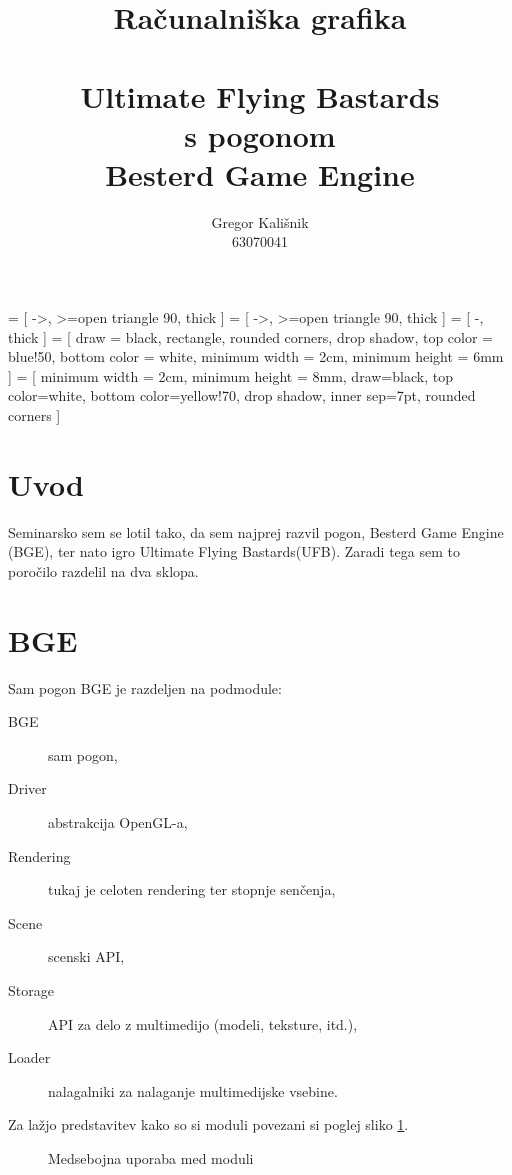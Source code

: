 \documentclass[a4paper]{article}
\author{Gregor Kališnik\\63070041}
\title{Računalniška grafika\\\ \\Ultimate Flying Bastards\\s pogonom\\Besterd Game Engine}
\begin{document}
 = [
  ->,
  >=open triangle 90,
  thick
]
 = [
  ->,
  >=open triangle 90,
  thick
]
 = [
  -,
  thick
]
 = [
  draw = black,
  rectangle,
  rounded corners,
  drop shadow,
  top color = blue!50,
  bottom color = white,
  minimum width = 2cm,
  minimum height = 6mm
]
 = [
  minimum width = 2cm,
  minimum height = 8mm,
  draw=black,
  top color=white,
  bottom color=yellow!70,
  drop shadow,
  inner sep=7pt,
  rounded corners
]

\maketitle
\pagebreak
\tableofcontents
\pagebreak
\listoffigures
\pagebreak

\section{Uvod}
Seminarsko sem se lotil tako, da sem najprej razvil pogon, Besterd Game Engine (BGE), ter nato igro Ultimate Flying Bastards(UFB). Zaradi tega sem to poročilo razdelil na dva sklopa.

\section{BGE}
Sam pogon BGE je razdeljen na podmodule:
\begin{description}
  \item[BGE] sam pogon,
  \item[Driver] abstrakcija OpenGL-a,
  \item[Rendering] tukaj je celoten rendering ter stopnje senčenja,
  \item[Scene] scenski API,
  \item[Storage] API za delo z multimedijo (modeli, teksture, itd.),
  \item[Loader] nalagalniki za nalaganje multimedijske vsebine.
\end{description}

Za lažjo predstavitev kako so si moduli povezani si poglej sliko \ref{graf:moduli}.
\begin{figure}
\centering
{}

\label{graf:moduli}
\caption{Medsebojna uporaba med moduli}
\end{figure}
\end{document}
